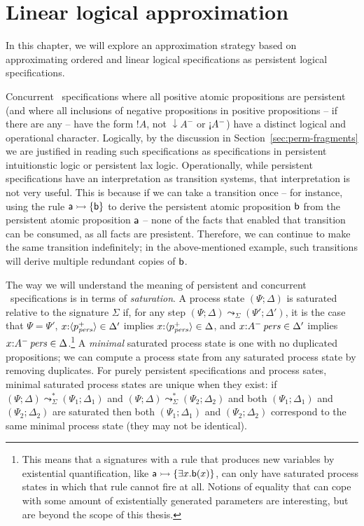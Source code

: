 \chapter{Linear logical approximation}
\label{chapter-approx}

In this chapter, we will explore an approximation strategy based on
approximating ordered and linear logical specifications as persistent
logical specifications. 

Concurrent \sls~specifications where all positive atomic propositions
are persistent (and where all inclusions of negative propositions in
positive propositions -- if there are any -- have the form ${!}A$, not
${\downarrow}A^-$ or ${\gnab}A^-$) have a distinct logical and
operational character. Logically, by the discussion in
Section~\ref{sec:perm-fragments} we are justified in reading such
specifications as specifications in persistent intuitionstic logic or
persistent lax logic. Operationally, while persistent specifications
have an interpretation as transition systems, that interpretation is
not very useful. This is because if we can take a transition once --
for instance, using the rule ${\sf a} \rightarrowtail \{ {\sf b} \}$ to derive
the persistent atomic proposition ${\sf b}$ from the persistent atomic
proposition ${\sf a}$ -- none of the facts that enabled that
transition can be consumed, as all facts are presistent. Therefore, we
can continue to make the same transition indefinitely; in the
above-mentioned example, such transitions will derive multiple
redundant copies of ${\sf b}$.

The way we will understand the meaning of persistent and
concurrent \sls~specifications is in terms of {\it saturation}. A
process state $(\Psi; \Delta)$ is saturated relative to the signature
$\Sigma$ if, for any step $(\Psi; \Delta) \leadsto_\Sigma (\Psi';
\Delta')$, it is the case that $\Psi = \Psi'$, $x{:}\langle {p^+_{\it pers}} \rangle
\in \Delta'$ implies $x{:}\langle {p^+_{\it pers}} \rangle \in \Delta$, and
$x{:}{A^-}\,{{\it pers}} \in \Delta'$ implies $x{:}{A^-}\,{{\it pers}} \in
\Delta$.\footnote{This means that a signatures with a rule that
  produces new variables by existential quantification, like ${\sf a}
  \rightarrowtail \{ \exists x. {\sf b}(x) \}$, can only have saturated process
  states in which that rule cannot fire at all. Notions of equality
  that can cope with some amount of existentially generated parameters
  are interesting, but are beyond the scope of this thesis.} A {\it
  minimal} saturated process state is one with no duplicated
propositions; we can compute a process state from any saturated
process state by removing duplicates. For purely persistent
specifications and process sates, minimal saturated process states are
unique when they exist: if $(\Psi; \Delta) \leadsto^*_\Sigma (\Psi_1;
\Delta_1)$ and $(\Psi; \Delta) \leadsto^*_\Sigma (\Psi_2; \Delta_2)$
and both $(\Psi_1; \Delta_1)$ and $(\Psi_2; \Delta_2)$ are saturated
then both $(\Psi_1; \Delta_1)$ and $(\Psi_2; \Delta_2)$ correspond to 
the same minimal process state (they may not be identical).

